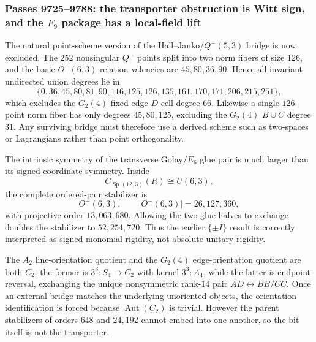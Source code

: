 \subsubsection*{Passes 9725--9788: the transporter obstruction is Witt sign, and the $F_9$ package has a local-field lift}
The natural point-scheme version of the Hall--Janko/$Q^-(5,3)$ bridge is now
excluded.  The $252$ nonsingular $Q^-$ points split into two norm fibers of size
$126$, and the basic $O^-(6,3)$ relation valencies are $45,80,36,90$.  Hence
all invariant undirected union degrees lie in
\[
\{0,36,45,80,81,90,116,125,126,135,161,170,171,206,215,251\},
\]
which excludes the $G_2(4)$ fixed-edge $D$-cell degree $66$.  Likewise a
single $126$-point norm fiber has only degrees $45,80,125$, excluding the
$G_2(4)$ $B\cup C$ degree $31$.  Any surviving bridge must therefore use a
derived scheme such as two-spaces or Lagrangians rather than point orthogonality.

The intrinsic symmetry of the transverse Golay/$E_6$ glue pair is much larger
than its signed-coordinate symmetry.  Inside
\[
C_{\operatorname{Sp}(12,3)}(R)\cong U(6,3),
\]
the complete ordered-pair stabilizer is
\[
\boxed{O^-(6,3)},\qquad |O^-(6,3)|=26,127,360,
\]
with projective order $13,063,680$.  Allowing the two glue halves to exchange
doubles the stabilizer to $52,254,720$.  Thus the earlier $\{\pm I\}$ result
is correctly interpreted as signed-monomial rigidity, not absolute unitary
rigidity.

The $A_2$ line-orientation quotient and the $G_2(4)$ edge-orientation quotient
are both $C_2$: the former is
$3^3{:}S_4\to C_2$ with kernel $3^3{:}A_4$, while the latter is endpoint
reversal, exchanging the unique nonsymmetric rank-$14$ pair
$AD\leftrightarrow BB/CC$.  Once an external bridge matches the underlying
unoriented objects, the orientation identification is forced because
$\operatorname{Aut}(C_2)$ is trivial.  However the parent stabilizers of orders
$648$ and $24,192$ cannot embed into one another, so the bit itself is not the
transporter.

